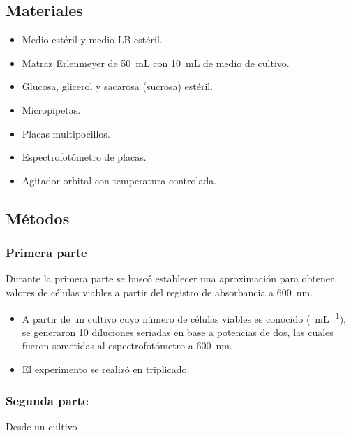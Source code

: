 \subsection{Materiales}

\begin{multicols}{2}
  \begin{itemize}
    \item Medio estéril y medio LB estéril.
    \item Matraz Erlenmeyer de \SI{50}{\mL} con \SI{10}{\mL} de medio de cultivo.
    \item Glucosa, glicerol y sacarosa (sucrosa) estéril. 
    \item Micropipetas. 
    \item Placas multipocillos. 
    \item Espectrofotómetro de placas. 
    \item Agitador orbital con temperatura controlada.
  \end{itemize}
\end{multicols}

\subsection{Métodos}

\subsubsection{Primera parte}

Durante la primera parte se buscó establecer una aproximación para obtener valores de células viables a partir del registro de absorbancia a \SI{600}{\nm}.
\begin{itemize}
  \item A partir de un cultivo cuyo número de células viables es conocido (\si{\ufc\per\mL}), se generaron 10 diluciones seriadas en base a potencias de dos, las cuales fueron sometidas al espectrofotómetro a \SI{600}{\nm}. 
  \item El experimento se realizó en triplicado.
\end{itemize}

\subsubsection{Segunda parte}

Desde un cultivo
